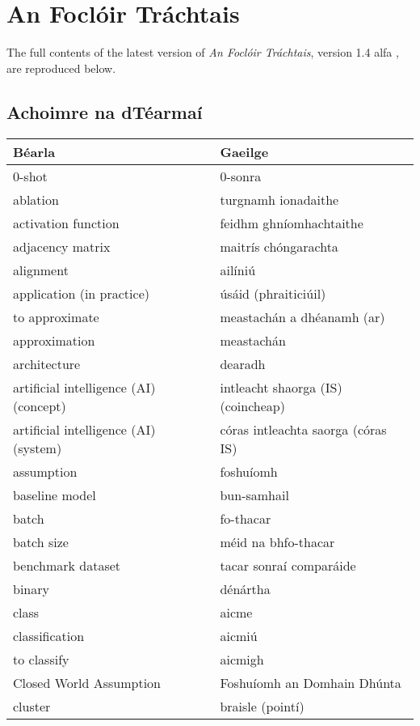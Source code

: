 \section{An Foclóir Tráchtais} \label{focloir-trachtais-content}
The full contents of the latest version of \textit{An Foclóir Tráchtais}, version 1.4 alfa \cite{focloir-trachtais}, are reproduced below.

\subsection{Achoimre na dTéarmaí}
\begin{longtable}{|l|l|}
	\hline
		\textbf{Béarla} & \textbf{Gaeilge}\\ \hline 
		0-shot&0-sonra\\ \hline 
		ablation&turgnamh ionadaithe\\ \hline 
		activation function&feidhm ghníomhachtaithe\\ \hline 
		adjacency matrix&maitrís chóngarachta\\ \hline 
		alignment&ailíniú\\ \hline 
		application (in practice)&úsáid (phraiticiúil)\\ \hline 
		to approximate&meastachán a dhéanamh (ar)\\ \hline 
		approximation&meastachán\\ \hline 
		architecture&dearadh\\ \hline 
		artificial intelligence (AI) (concept)&intleacht shaorga (IS) (coincheap)\\ \hline 
		artificial intelligence (AI) (system)&córas intleachta saorga (córas IS)\\ \hline 
		assumption&foshuíomh\\ \hline 
		baseline model&bun-samhail\\ \hline 
		batch&fo-thacar\\ \hline 
		batch size&méid na bhfo-thacar\\ \hline 
		benchmark dataset&tacar sonraí comparáide\\ \hline 
		binary&dénártha\\ \hline 
		class&aicme\\ \hline 
		classification&aicmiú\\ \hline 
		to classify&aicmigh\\ \hline 
		Closed World Assumption&Foshuíomh an Domhain Dhúnta\\ \hline 
		cluster&braisle (pointí)\\ \hline 

\end{longtable}
